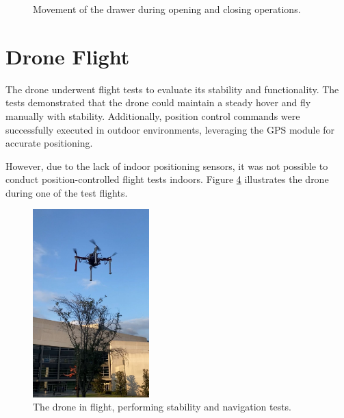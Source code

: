 \begin{figure}[H]
    \centering
    \begin{subfigure}[H]{0.4\textwidth}
        \centering
        \label{fig:drawer_open}
    \end{subfigure}
    \begin{subfigure}[H]{0.4\textwidth}
        \centering
        \label{fig:drawer_closed}
    \end{subfigure}
    \caption{Movement of the drawer during opening and closing operations.}
    \label{fig:drawer_movement}
\end{figure}

\section{Drone Flight}

The drone underwent flight tests to evaluate its stability and functionality. The tests demonstrated that the drone could maintain a steady hover and fly manually with stability. Additionally, position control commands were successfully executed in outdoor environments, leveraging the GPS module for accurate positioning.

However, due to the lack of indoor positioning sensors, it was not possible to conduct position-controlled flight tests indoors. Figure \ref{fig:drone_flight_test} illustrates the drone during one of the test flights.

\begin{figure}[H]
    \centering
    \includegraphics[width=0.4\textwidth]{pictures/drone_volando.jpeg}
    \caption{The drone in flight, performing stability and navigation tests.}
    \label{fig:drone_flight_test}
\end{figure}

